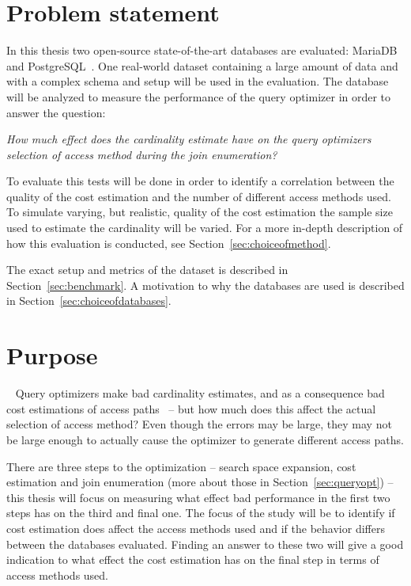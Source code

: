 \section{Problem statement}
In this thesis two open-source state-of-the-art databases are evaluated:
MariaDB~\cite{mariadb_m} and PostgreSQL~\cite{postgresql_ptwmaosd}. One
real-world dataset containing a large amount of data and with a complex schema
and setup will be used in the evaluation. The database will be analyzed to
measure the performance of the query optimizer in order to answer the question:

\textit{How much effect does the cardinality estimate have on the query optimizers
  selection of access method during the join enumeration?}

To evaluate this tests will be done in order to identify a correlation between
the quality of the cost estimation and the number of different access methods
used. To simulate varying, but realistic, quality of the cost estimation the
sample size used to estimate the cardinality will be varied. For a more in-depth
description of how this evaluation is conducted, see Section~\ref{sec:choiceofmethod}.

The exact setup and metrics of the dataset is described in
Section~\ref{sec:benchmark}. A motivation to why the databases are used is
described in Section~\ref{sec:choiceofdatabases}.

\section{Purpose}~\label{sec:purpose}
Query optimizers make bad cardinality estimates, and as a consequence bad cost
estimations of access paths~\cite{leis_2015_how_hgaqor} – but how much does this
affect the actual selection of access method? Even though the errors may be large,
they may not be large enough to actually cause the optimizer to generate
different access paths.

There are three steps to the optimization – search space expansion, cost
estimation and join enumeration (more about those in Section~\ref{sec:queryopt})
– this thesis will focus on measuring what effect bad performance in the first
two steps has on the third and final one. The focus of the study will be to
identify if cost estimation does affect the access methods used and if the
behavior differs between the databases evaluated. Finding an answer to these two
will give a good indication to what effect the cost estimation has on the final
step in terms of access methods used.

